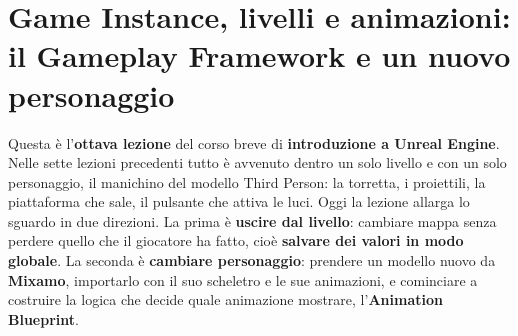%
%
%
%    
%

\chapter[Game Instance, livelli e animazioni]{Game Instance, livelli e animazioni: il
Gameplay Framework e un nuovo personaggio}
\label{ue8:cap:gameinstance}

Questa è l'\textbf{ottava lezione} del corso breve di \textbf{introduzione a Unreal
Engine}. Nelle sette lezioni precedenti tutto è avvenuto dentro un solo livello e con un
solo personaggio, il manichino del modello Third Person: la torretta, i proiettili, la
piattaforma che sale, il pulsante che attiva le luci. Oggi la lezione allarga lo sguardo
in due direzioni. La prima è \textbf{uscire dal livello}: cambiare mappa senza perdere
quello che il giocatore ha fatto, cioè \textbf{salvare dei valori in modo globale}. La
seconda è \textbf{cambiare personaggio}: prendere un modello nuovo da \textbf{Mixamo},
importarlo con il suo scheletro e le sue animazioni, e cominciare a costruire la logica
che decide quale animazione mostrare, l'\textbf{Animation Blueprint}.

